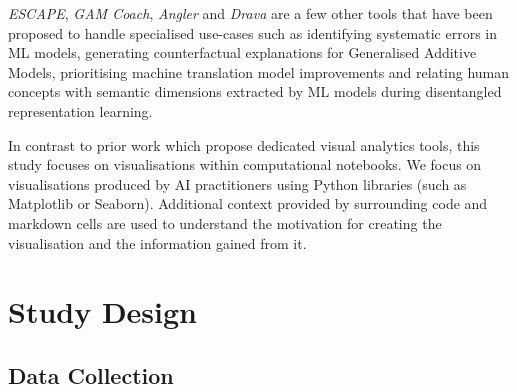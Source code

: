 \textit{ESCAPE}, \textit{GAM Coach}, \textit{Angler} and
\textit{Drava} are a few other tools that have been proposed to handle
specialised use-cases such as identifying systematic errors in ML
models, generating counterfactual explanations for Generalised
Additive Models, prioritising machine translation model improvements
and relating human concepts with semantic dimensions extracted by ML
models during disentangled representation learning\cite{ahn2023escape,
  wang2023gam, robertson2023angler, wang2023drava}.

In contrast to prior work which propose dedicated visual analytics
tools, this study focuses on visualisations within computational
notebooks. We focus on visualisations produced by AI practitioners
using Python libraries (such as Matplotlib or Seaborn). Additional
context provided by surrounding code and markdown cells are used to
understand the motivation for creating the visualisation and the
information gained from it.

\section{Study Design}



\subsection{Data Collection}\label{sec:data-collect}

